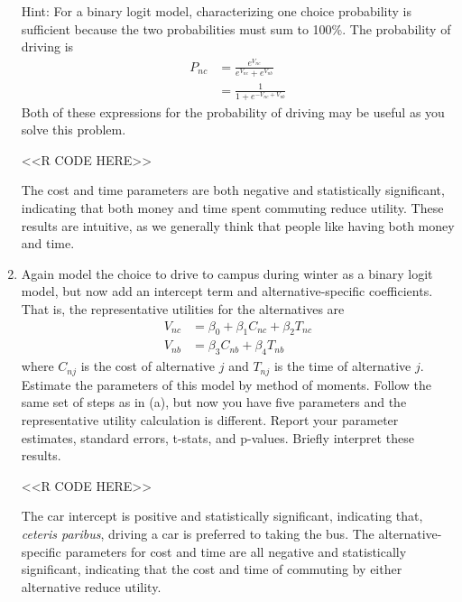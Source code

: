 \documentclass[11pt,letterpaper]{article}
\begin{document}
\begin{enumerate}[label=\alph*., leftmargin=*]
	Hint: For a binary logit model, characterizing one choice probability is sufficient because the two probabilities must sum to 100\%. The probability of driving is
	\begin{align*}
		P_{nc} &= \frac{e^{V_{nc}}}{e^{V_{nc}} + e^{V_{nb}}} \\
		&= \frac{1}{1 + e^{-V_{nc} + V_{nb}}}
	\end{align*}
	Both of these expressions for the probability of driving may be useful as you solve this problem.

	<<R CODE HERE>>

	The cost and time parameters are both negative and statistically significant, indicating that both money and time spent commuting reduce utility. These results are intuitive, as we generally think that people like having both money and time.

	\item Again model the choice to drive to campus during winter as a binary logit model, but now add an intercept term and alternative-specific coefficients. That is, the representative utilities for the alternatives are
	\begin{align*}
		V_{nc} &= \beta_0 + \beta_1 C_{nc} + \beta_2 T_{nc} \\
		V_{nb} &= \beta_3 C_{nb} + \beta_4 T_{nb}
	\end{align*}
	where $C_{nj}$ is the cost of alternative $j$ and $T_{nj}$ is the time of alternative $j$. Estimate the parameters of this model by method of moments. Follow the same set of steps as in (a), but now you have five parameters and the representative utility calculation is different. Report your parameter estimates, standard errors, t-stats, and p-values. Briefly interpret these results.

	<<R CODE HERE>>

	The car intercept is positive and statistically significant, indicating that, \emph{ceteris paribus}, driving a car is preferred to taking the bus. The alternative-specific parameters for cost and time are all negative and statistically significant, indicating that the cost and time of commuting by either alternative reduce utility.


\end{enumerate}
\end{document}
